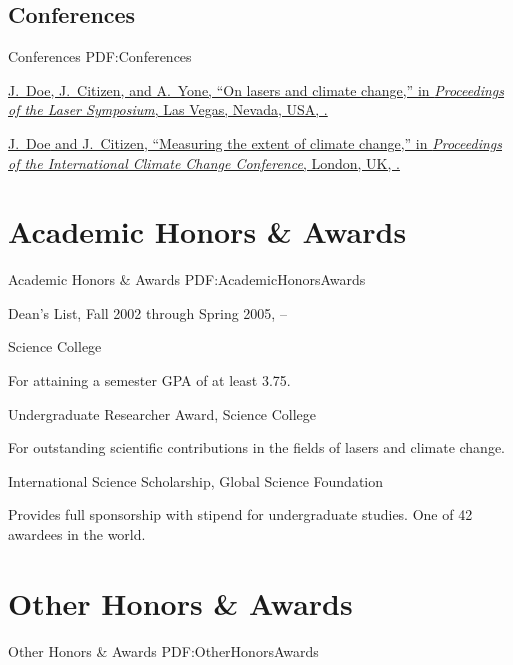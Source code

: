 \documentclass[a4paper,10pt,oneside]{article}
\begin{document}
\begin{body}
\EntryGap
\subsection
{Conferences}
{Conferences}
{PDF:Conferences}

\EntryGap
{}
\href{http://www.example.com/my-paper-doi-2}
{\underline{J.~Doe}, J.~Citizen, and A.~Yone,
``On lasers and climate change,''
in \textit{Proceedings of the Laser Symposium},
Las Vegas, Nevada, USA,
.}

\EntryGap
{}
\href{http://www.example.com/my-paper-doi-1}
{\underline{J.~Doe} and J.~Citizen,
``Measuring the extent of climate change,''
in \textit{Proceedings of the International Climate Change Conference},
London, UK,
.}


\section
{Academic Honors\newline
\& Awards}
{Academic Honors \& Awards}
{PDF:AcademicHonorsAwards}

Dean's List,
Fall 2002 through Spring 2005,
\hfill
{} --
\par
Science College
\begin{detail}
For attaining a semester GPA of at least 3.75.
\end{detail}

\EntryGap
Undergraduate Researcher Award,
Science College
\hfill
{}
\begin{detail}
For outstanding scientific contributions in the fields of lasers and climate change.
\end{detail}

\EntryGap
International Science Scholarship,
Global Science Foundation
\hfill
{}
\begin{detail}
Provides full sponsorship with stipend for undergraduate studies.
One of 42 awardees in the world.
\end{detail}


\section
{Other Honors\newline
\& Awards}
{Other Honors \& Awards}
{PDF:OtherHonorsAwards}


\end{body}
\end{document}
